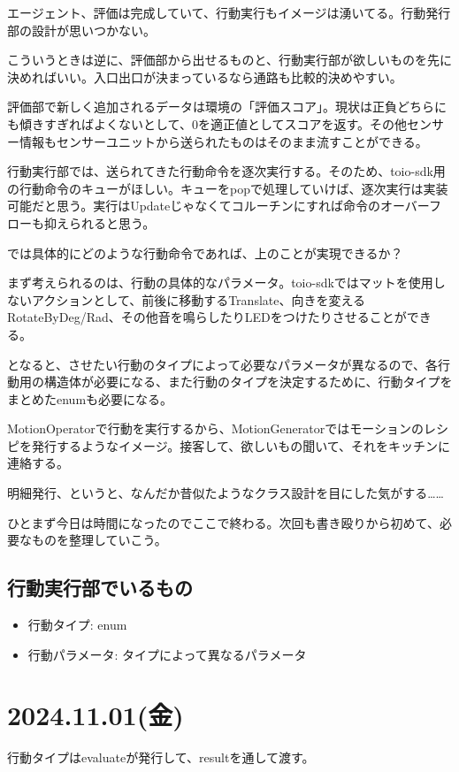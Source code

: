 \documentclass[fleqn,twocolumn]{mynote}
\begin{document}
エージェント、評価は完成していて、行動実行もイメージは湧いてる。行動発行部の設計が思いつかない。

こういうときは逆に、評価部から出せるものと、行動実行部が欲しいものを先に決めればいい。入口出口が決まっているなら通路も比較的決めやすい。

評価部で新しく追加されるデータは環境の「評価スコア」。現状は正負どちらにも傾きすぎればよくないとして、0を適正値としてスコアを返す。その他センサー情報もセンサーユニットから送られたものはそのまま流すことができる。

行動実行部では、送られてきた行動命令を逐次実行する。そのため、toio-sdk用の行動命令のキューがほしい。キューをpopで処理していけば、逐次実行は実装可能だと思う。実行はUpdateじゃなくてコルーチンにすれば命令のオーバーフローも抑えられると思う。

では具体的にどのような行動命令であれば、上のことが実現できるか？

まず考えられるのは、行動の具体的なパラメータ。toio-sdkではマットを使用しないアクションとして、前後に移動するTranslate、向きを変えるRotateByDeg/Rad、その他音を鳴らしたりLEDをつけたりさせることができる。

となると、させたい行動のタイプによって必要なパラメータが異なるので、各行動用の構造体が必要になる、また行動のタイプを決定するために、行動タイプをまとめたenumも必要になる。

MotionOperatorで行動を実行するから、MotionGeneratorではモーションのレシピを発行するようなイメージ。接客して、欲しいもの聞いて、それをキッチンに連絡する。

明細発行、というと、なんだか昔似たようなクラス設計を目にした気がする……

ひとまず今日は時間になったのでここで終わる。次回も書き殴りから初めて、必要なものを整理していこう。

\subsection*{行動実行部でいるもの}
\begin{itemize}
  \item 行動タイプ: enum
  \item 行動パラメータ: タイプによって異なるパラメータ
\end{itemize}

\section*{2024.11.01(金)}

行動タイプはevaluateが発行して、resultを通して渡す。
\end{document}
